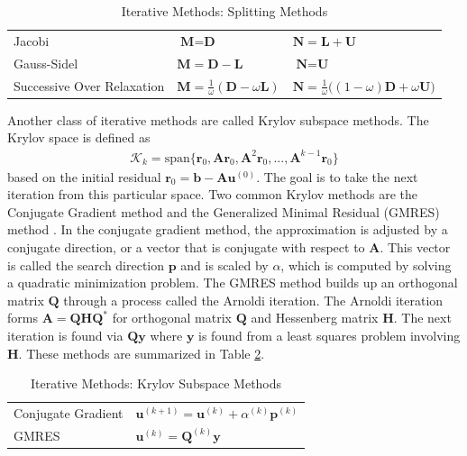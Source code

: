 \begin{table}[h!]
    \centering
    \begin{tabular}{ | l | l | l |}
        \hline
        Jacobi & $\textbf{M} = \textbf{D}$ & $\textbf{N} = \textbf{L} + \textbf{U}$ \\
        Gauss-Sidel & $\textbf{M} = \textbf{D} - \textbf{L}$ & $\textbf{N} = \textbf{U}$ \\
        Successive Over Relaxation & $\textbf{M} = \frac{1}{\omega}(\textbf{D} - \omega \textbf{L})$ & $\textbf{N} = \frac{1}{\omega} \big( (1 - \omega) \textbf{D} + \omega \textbf{U} \big)$ \\
        \hline
    \end{tabular}
    \caption{Iterative Methods: Splitting Methods}
    \label{tab:splitting}
\end{table}

Another class of iterative methods are called Krylov subspace methods. The Krylov space is defined as
\begin{align}
\mathcal{K}_k = \text{span} \{ \textbf{r}_0, \textbf{A} \textbf{r}_0, \textbf{A}^2 \textbf{r}_0, ..., \textbf{A}^{k-1} \textbf{r}_0 \}
\end{align}
based on the initial residual $\textbf{r}_0 = \textbf{b} - \textbf{A} \textbf{u}^{(0)}$. The goal is to take the next iteration from this particular space. Two common Krylov methods are the Conjugate Gradient method \cite{hestenes1952methods} and the Generalized Minimal Residual (GMRES) method \cite{saad1986gmres}. In the conjugate gradient method, the approximation is adjusted by a conjugate direction, or a vector that is conjugate with respect to $\textbf{A}$. This vector is called the search direction $\textbf{p}$ and is scaled by $\alpha$, which is computed by solving a quadratic minimization problem. The GMRES method builds up an orthogonal matrix $\textbf{Q}$ through a process called the Arnoldi iteration. The Arnoldi iteration forms $\textbf{A} = \textbf{Q} \textbf{H} \textbf{Q}^*$ for orthogonal matrix $\textbf{Q}$ and Hessenberg matrix $\textbf{H}$. The next iteration is found via $\textbf{Q} \textbf{y}$ where $\textbf{y}$ is found from a least squares problem involving $\textbf{H}$. These methods are summarized in Table \ref{tab:ksm}.

\begin{table}[h!]
    \centering
    \begin{tabular}{ | l | l |}
        \hline
        Conjugate Gradient & $\textbf{u}^{(k+1)} = \textbf{u}^{(k)} + \alpha^{(k)} \textbf{p}^{(k)}$ \\
        GMRES & $\textbf{u}^{(k)} = \textbf{Q}^{(k)} \textbf{y}$ \\
        \hline
    \end{tabular}
    \caption{Iterative Methods: Krylov Subspace Methods}
    \label{tab:ksm}
\end{table}

